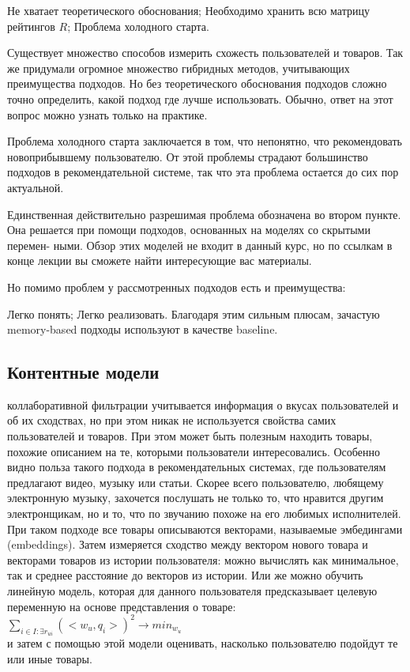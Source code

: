 \documentclass{article}
\newcommand\tab[1][1cm]{\hspace*{#1}}
\begin{document}
Не хватает теоретического обоснования;
Необходимо хранить всю матрицу рейтингов ﻿$R$;
Проблема холодного старта.

Существует множество способов измерить схожесть пользователей и товаров. Так же придумали огромное множество гибридных методов, учитывающих преимущества подходов. Но без теоретического обоснования подходов сложно точно определить, какой подход где лучше использовать. Обычно, ответ на этот вопрос можно узнать только на практике.

Проблема холодного старта заключается в том, что непонятно, что рекомендовать новоприбывшему пользователю. От этой проблемы страдают большинство подходов в рекомендательной системе, так что эта проблема остается до сих пор актуальной.

Единственная действительно разрешимая проблема обозначена во втором пункте. Она решается при помощи подходов, основанных на моделях со скрытыми перемен- ными. Обзор этих моделей не входит в данный курс, но по ссылкам в конце лекции вы сможете найти интересующие вас материалы.

Но помимо проблем у рассмотренных подходов есть и преимущества:

Легко понять;
Легко реализовать.
Благодаря этим сильным плюсам, зачастую memory-based подходы используют в качестве baseline.
\subsection*{Контентные модели}
 коллаборативной фильтрации учитывается информация о вкусах пользователей и об их сходствах, но при этом никак не используется свойства самих пользователей и товаров. При этом может быть полезным находить товары, похожие описанием на те, которыми пользователи интересовались. Особенно видно польза такого подхода в рекомендательных системах, где пользователям предлагают видео, музыку или статьи. Скорее всего пользователю, любящему электронную музыку, захочется послушать не только то, что нравится другим электронщикам, но и то, что по звучанию похоже на его любимых исполнителей. \\
При таком подходе все товары описываются векторами, называемые эмбедингами (embeddings). Затем измеряется сходство между вектором нового товара и векторами товаров из истории пользователя: можно вычислять как минимальное, так и среднее расстояние до векторов из истории. Или же можно обучить линейную модель, которая для данного пользователя предсказывает целевую переменную на основе представления о товаре:\\
$\sum_{i\in I:\exists r_{ui}}{(<w_u,q_i>)^2 \to min_{w_{u}}}$\\
и затем с помощью этой модели оценивать, насколько пользователю подойдут те или иные товары.
\end{document}

